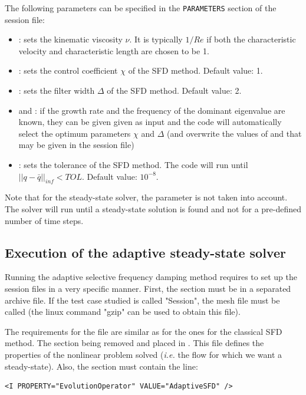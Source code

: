 The following parameters can be specified in the \texttt{PARAMETERS} section of the session file:

\begin{itemize}
\item {}: sets the kinematic viscosity $\nu$. It is typically $1/Re$ if both the characteristic velocity and characteristic length are chosen to be 1. 
\item {}: sets the control coefficient $\chi$ of the SFD method. Default value: 1.
\item {}: sets the filter width $\Delta$ of the SFD method. Default value: 2.
\item {} and : if the growth rate and the frequency of the dominant eigenvalue are known, they can be given given as input and the code will automatically select the optimum parameters $\chi$ and $\Delta$ (and overwrite the values of  and  that may be given in the session file)
\item {}: sets the tolerance of the SFD method. The code will run until $||q-\bar{q}||_{inf}<TOL$.  Default value: $10^{-8}$.
\end{itemize}

Note that for the steady-state solver, the parameter  is not taken into account. The solver will run until a steady-state solution is found and not for a pre-defined number of time steps.

\subsection{Execution of the adaptive steady-state solver}

Running the adaptive selective frequency damping method requires to set up the session files in a very specific manner. First, the  section must be in a separated archive file. If the test case studied is called "Session", the mesh file must be called  (the linux command "gzip" can be used to obtain this file).

The requirements for the file  are similar as for the ones for the classical SFD method. The  section being removed and placed in . This file defines the properties of the nonlinear problem solved (\textit{i.e.} the flow for which we want a steady-state). Also, the  section must contain the line:
\begin{lstlisting}[style=XMLStyle]
<I PROPERTY="EvolutionOperator" VALUE="AdaptiveSFD" />
\end{lstlisting}


